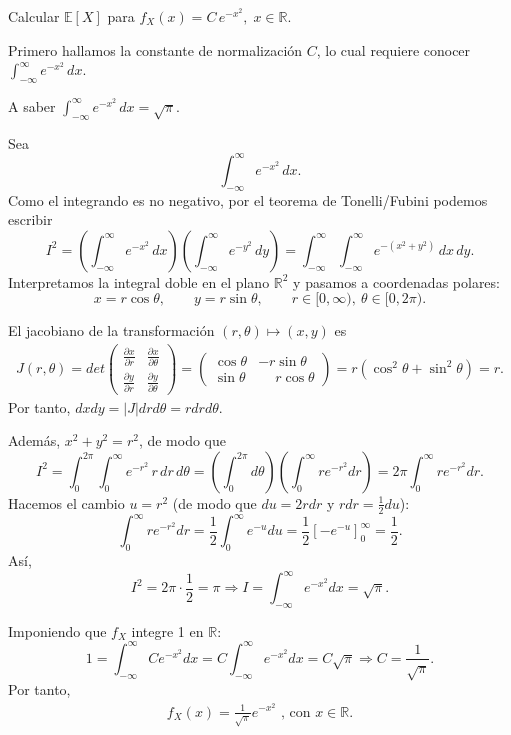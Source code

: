 \begin{Note}
Calcular $\mathbb{E}[X]$  para $f_X(x)=C\,e^{-x^2},\; x\in\mathbb{R}$.

Primero hallamos la constante de normalización \(C\), lo cual requiere conocer
\(\displaystyle \int_{-\infty}^{\infty} e^{-x^2}\,dx\).

A saber  \(\displaystyle \int_{-\infty}^{\infty} e^{-x^2}\,dx=\sqrt{\pi}\).

Sea
\[\int_{-\infty}^{\infty} e^{-x^2}\,dx.\]
Como el integrando es no negativo, por el teorema de Tonelli/Fubini podemos escribir
\[
I^2 = \left(\int_{-\infty}^{\infty} e^{-x^2}\,dx\right)\left(\int_{-\infty}^{\infty} e^{-y^2}\,dy\right)=\int_{-\infty}^{\infty}\int_{-\infty}^{\infty} e^{-(x^2+y^2)}\,dx\,dy.
\]
Interpretamos la integral doble en el plano \(\mathbb{R}^2\) y pasamos a coordenadas polares:
\[
x = r\cos\theta,\qquad y = r\sin\theta,\qquad r\in[0,\infty),\ \theta\in[0,2\pi).
\]

El jacobiano de la transformación \((r,\theta)\mapsto(x,y)\) es
\begin{eqnarray}
J(r,\theta)
=det\left(\begin{array}{cc}
\frac{\partial x}{\partial r} & \frac{\partial x}{\partial \theta}\\
\frac{\partial y}{\partial r} & \frac{\partial y}{\partial \theta}
\end{array}
\right)
=\left(\begin{array}{cc}
\cos\theta & -r\sin\theta\\
\sin\theta & \phantom{-}r\cos\theta
\end{array}\right)
= r(\cos^2\theta+\sin^2\theta)=r.
\end{eqnarray}
Por tanto, \(dx dy = \vert J\vert dr d\theta = r dr d\theta\).

Además, \(x^2+y^2=r^2\), de modo que
\[
I^2
= \int_{0}^{2\pi}\int_{0}^{\infty} e^{-r^2}\,r\,dr\,d\theta
= \left(\int_{0}^{2\pi} d\theta\right)\left(\int_{0}^{\infty} r e^{-r^2} dr\right)
= 2\pi \int_{0}^{\infty} r e^{-r^2} dr.
\]
Hacemos el cambio \(u=r^2\) (de modo que \(du=2r dr\) y \(rdr=\frac{1}{2}du\)):
\[
\int_{0}^{\infty} r e^{-r^2} dr
= \frac{1}{2}\int_{0}^{\infty} e^{-u} du
= \frac{1}{2}[-e^{-u}]_{0}^{\infty}
= \frac{1}{2}.
\]
Así,
\[
I^2 = 2\pi\cdot\frac12 = \pi\Longrightarrow I=\int_{-\infty}^{\infty} e^{-x^2}dx=\sqrt{\pi}.
\]


Imponiendo que \(f_X\) integre 1 en \(\mathbb{R}\):
\[
1=\int_{-\infty}^{\infty} C e^{-x^2} dx = C\int_{-\infty}^{\infty} e^{-x^2} dx
= C \sqrt{\pi} \Rightarrow C=\frac{1}{\sqrt{\pi}}.
\]
Por tanto,
\begin{eqnarray*}
f_X(x)=\frac{1}{\sqrt{\pi}} e^{-x^2}\textrm{ , con }x\in\mathbb{R}.
\end{eqnarray*}


\end{Note}

